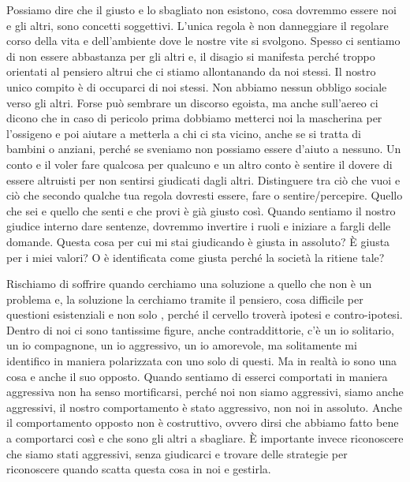 \documentclass[12pt]{book} %
\begin{document}
Possiamo dire che il giusto e lo sbagliato non esistono, cosa dovremmo essere noi e gli altri, sono concetti
soggettivi. L'unica regola è non danneggiare il regolare corso della vita e
dell'ambiente dove le nostre vite si svolgono. Spesso ci sentiamo di non essere abbastanza per gli
altri e, il disagio si manifesta perché troppo orientati al pensiero altrui che ci stiamo allontanando da noi stessi.
Il nostro unico compito è di occuparci di noi stessi. Non abbiamo nessun obbligo sociale verso gli altri. Forse può sembrare un
discorso egoista, ma anche sull'aereo ci dicono che in caso di pericolo prima dobbiamo
metterci noi la mascherina per l'ossigeno e poi aiutare a metterla a chi ci sta vicino, anche se
si tratta di bambini o anziani, perché se sveniamo non possiamo essere d'aiuto a nessuno. 
Un conto e il voler fare qualcosa per qualcuno e un altro conto è sentire il
dovere di essere altruisti per non sentirsi giudicati dagli altri. Distinguere tra ciò
che vuoi e ciò che secondo qualche tua regola dovresti essere, fare o sentire/percepire. Quello che sei e quello che
senti e che provi è già giusto così. 
Quando sentiamo il nostro giudice interno dare sentenze, dovremmo invertire i ruoli e iniziare a fargli delle domande. Questa
cosa per cui mi stai giudicando è giusta in assoluto? È giusta per i miei valori? O è identificata come giusta perché
la società la ritiene tale?

Rischiamo di soffrire quando cerchiamo una soluzione a quello che non è un problema e, la soluzione la cerchiamo tramite il
pensiero, cosa difficile per questioni esistenziali e non solo , perché il cervello troverà ipotesi e contro-ipotesi. Dentro
di noi ci sono tantissime figure, anche contraddittorie, c'è un io solitario, un io compagnone, un io aggressivo, un io
amorevole, ma solitamente mi identifico in maniera polarizzata con uno solo di questi. Ma in realtà io sono una cosa e
anche il suo opposto. Quando sentiamo di esserci comportati in maniera aggressiva non ha senso mortificarsi, perché noi
non siamo aggressivi, siamo anche aggressivi, il nostro comportamento è stato aggressivo, non noi in assoluto. Anche il
comportamento opposto non è costruttivo, ovvero dirsi che abbiamo fatto bene a comportarci così e che sono gli altri a
sbagliare. È importante invece riconoscere che siamo stati aggressivi, senza giudicarci e trovare delle strategie per
riconoscere quando scatta questa cosa in noi e gestirla. 
\end{document}
